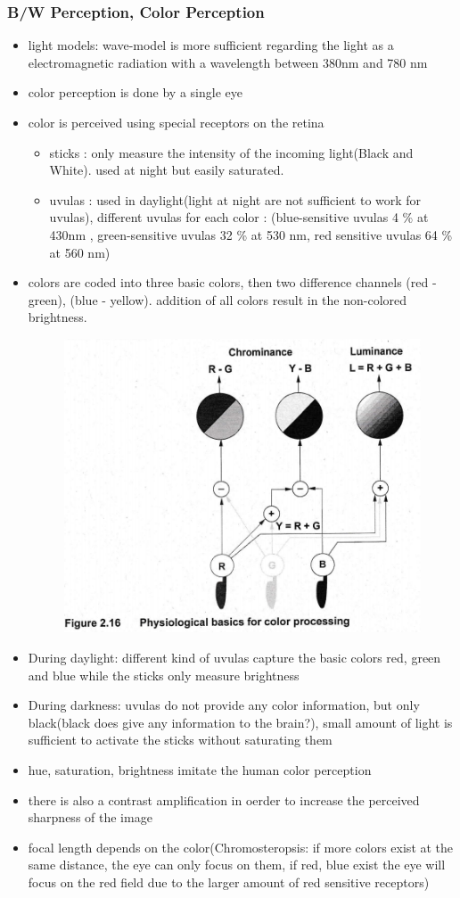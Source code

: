 \documentclass{standalone}
\begin{document}
\subsubsection{B/W Perception, Color Perception}
\begin{itemize}
	\item light models: wave-model is more sufficient regarding the light as a electromagnetic radiation with a wavelength between 380nm and 780 nm
	\item color perception is done by a single eye
	\item color is perceived using special receptors on the retina
	\begin{itemize}
		\item sticks : only measure the intensity of the incoming light(Black and White). used at night but easily saturated.
		\item uvulas : used in daylight(light at night are not sufficient to work for uvulas), different uvulas for each color : (blue-sensitive uvulas 4 \% at 430nm , green-sensitive uvulas 32 \% at 530 nm, red sensitive uvulas 64 \% at 560 nm)
	\end{itemize}
	\item colors are coded into three basic colors, then two difference channels (red - green), (blue - yellow). addition of all colors result in the non-colored brightness.
		\begin{figure}[H]
			\centering
			\includegraphics[width = 0.5\linewidth]{Figures/2_16.png}
		\end{figure}
\item During daylight: different kind of uvulas capture the basic colors red, green and blue while the sticks only measure brightness
\item During darkness: uvulas do not provide any color information, but only black(black does give any information to the brain?), small amount of light is sufficient to activate the sticks without saturating them
\item hue, saturation, brightness imitate the human color perception
\item there is also a contrast amplification in oerder to increase the perceived sharpness of the image
\item focal length depends on the color(Chromosteropsis: if more colors exist at the same distance, the eye can only focus on them, if red, blue exist the eye will focus on the red field due to the larger amount of red sensitive receptors)
\end{itemize}
\end{document}
